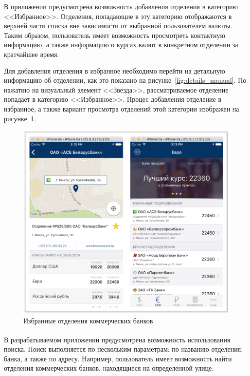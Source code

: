 В приложении предусмотрена возможность добавления отделения в категорию <<Избранное>>.
Отделения, попадающие в эту категорию отображаются в верхней части списка
вне зависимости от выбранной пользователем валюты. Таким образом, пользователь
имеет возможность просмотреть контактную информацию, а также информацию о
курсах валют в конкретном отделении за кратчайшее время.

Для добавления отделения в избранное необходимо перейти на детальную информацию
об отделении, как это показано на рисунке~\ref{fig:details_manual}. По нажатию
на визуальный элемент <<Звезда>>, рассматриваемое отделение попадает
в категорию <<Избранное>>. Процес добавления отделение в избранное,
а также вариант просмотра отделений этой категории изображен
на рисунке~\ref{fig:favorite_manual}.
\begin{figure}[h!]
  \centering
  \includegraphics[width=140mm]{fig/favorite_manual}
  \caption{Избранные отделения коммерческих банков}
  \label{fig:favorite_manual}
\end{figure}



\paragraph{}

В разрабатываемом приложении предусмотрена возможность использования поиска.
Поиск выполняется по нескольким параметрам: по названию отделения, банка,
а также по адресу. Например, пользователь имеет возможность найти отделения
коммерческих банков, находящиеся на определенной улице.


